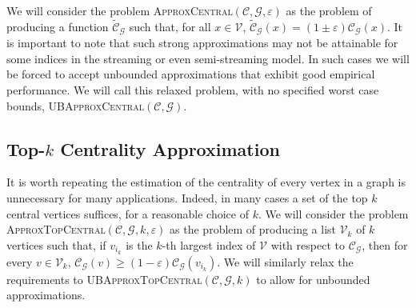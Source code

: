 \documentclass{report}
\newcommand{\algoname}[1]{\textnormal{\textsc{#1}}}
\begin{document}
We will consider the problem \algoname{ApproxCentral}$(\mathcal{C}, \mathcal{G}, \varepsilon)$ as the problem of producing a function $\widetilde{\mathcal{C}}_\mathcal{G}$ such that, for all $x \in \mathcal{V}$, $\widetilde{\mathcal{C}}_\mathcal{G}(x) = (1 \pm \varepsilon)\mathcal{C}_\mathcal{G}(x)$. 
It is important to note that such strong approximations may not be attainable for some indices in the streaming or even semi-streaming model. 
In such cases we will be forced to accept unbounded approximations that exhibit good empirical performance. 
We will call this relaxed problem, with no specified worst case bounds, \algoname{UBApproxCentral}$(\mathcal{C}, \mathcal{G})$. 


\subsection{Top-$k$ Centrality Approximation} \label{sec:approx:topk}

It is worth repeating the estimation of the centrality of every vertex in a graph is unnecessary for many applications.
Indeed, in many cases a set of the top $k$ central vertices suffices, for a reasonable choice of $k$. 
We will consider the problem \algoname{ApproxTopCentral}$(\mathcal{C}, \mathcal{G}, k, \varepsilon)$ as the problem of producing a list $\mathcal{V}_k$ of $k$ vertices such that, if $v_{i_k}$ is the $k$-th largest index of $\mathcal{V}$ with respect to $\mathcal{C}_\mathcal{G}$, then for every $v \in \mathcal{V}_k$, $\mathcal{C}_\mathcal{G}(v) \geq (1-\varepsilon)\mathcal{C}_\mathcal{G}(v_{i_k})$. 
We will similarly relax the requirements to \algoname{UBApproxTopCentral}$(\mathcal{C}, \mathcal{G}, k)$ to allow for unbounded approximations. 
\end{document}
